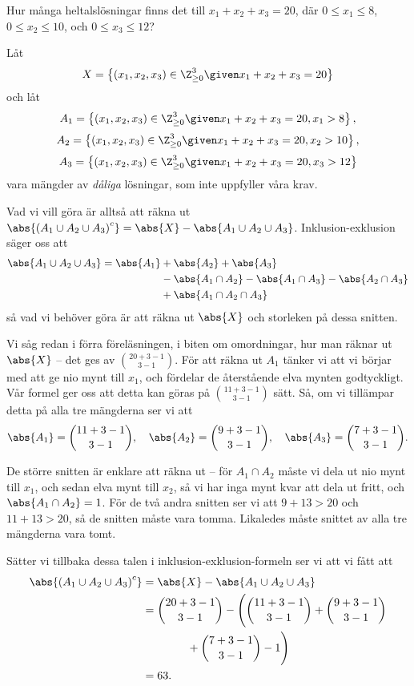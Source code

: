\documentclass[nobib]{tufte-handout}
\begin{document}
\begin{example}
  Hur många heltalslösningar finns det till $x_1 + x_2 + x_3 = 20$, där $0 \leq x_1 \leq 8$, $0 \leq x_2 \leq 10$, och $0 \leq x_3 \leq 12$?

  Låt
  $$X = \left\{(x_1, x_2, x_3) \in \Z_{\geq 0}^3 \given x_1 + x_2 + x_3 = 20\right\}$$
  och låt
  $$A_1 = \left\{(x_1, x_2, x_3) \in \Z_{\geq 0}^3 \given x_1 + x_2 + x_3 = 20, x_1 > 8\right\},$$
  $$A_2 = \left\{(x_1, x_2, x_3) \in \Z_{\geq 0}^3 \given x_1 + x_2 + x_3 = 20, x_2 > 10\right\},$$
  $$A_3 = \left\{(x_1, x_2, x_3) \in \Z_{\geq 0}^3 \given x_1 + x_2 + x_3 = 20, x_3 > 12\right\}$$
  vara mängder av \emph{dåliga} lösningar, som inte uppfyller våra krav.

  Vad vi vill göra är alltså att räkna ut $\abs{\left(A_1 \cup A_2 \cup A_3\right)^c} = \abs{X} - \abs{A_1 \cup A_2 \cup A_3}$. 
  Inklusion-exklusion säger oss att
  \begin{align*}
    \abs{A_1 \cup A_2 \cup A_3} = \abs{A_1}& + \abs{A_2} + \abs{A_3}\\
    &- \abs{A_1 \cap A_2} - \abs{A_1 \cap A_3} - \abs{A_2 \cap A_3}\\
    &+ \abs{A_1 \cap A_2 \cap A_3}
  \end{align*}
  så vad vi behöver göra är att räkna ut $\abs{X}$ och storleken på dessa snitten.

  Vi såg redan i förra föreläsningen, i biten om omordningar, hur man räknar ut $\abs{X}$ -- det ges av $\binom{20+3-1}{3-1}$. För att räkna ut $A_1$ tänker vi att vi börjar med att ge nio mynt till $x_1$, och fördelar de återstående elva mynten godtyckligt. Vår formel ger oss att detta kan göras på $\binom{11+3-1}{3-1}$ sätt. Så, om vi tillämpar detta på alla tre mängderna ser vi att
  $$\abs{A_1} = \binom{11+3-1}{3-1}, \quad\abs{A_2} = \binom{9+3-1}{3-1}, \quad\abs{A_3} = \binom{7+3-1}{3-1}.$$

  De större snitten är enklare att räkna ut -- för $A_1\cap A_2$ måste vi dela ut nio mynt till $x_1$, och sedan elva mynt till $x_2$, så vi har inga mynt kvar att dela ut fritt, och $\abs{A_1 \cap A_2} = 1$. För de två andra snitten ser vi att $9 + 13 > 20$ och $11 + 13 > 20$, så de snitten måste vara tomma. Likaledes måste snittet av alla tre mängderna vara tomt.

  Sätter vi tillbaka dessa talen i inklusion-exklusion-formeln ser vi att vi fått att
  \begin{align*}
    \abs{\left(A_1 \cup A_2 \cup A_3\right)^c} &= \abs{X} - \abs{A_1 \cup A_2 \cup A_3}\\
    &= \binom{20 + 3 - 1}{3 - 1} - \Bigg(\binom{11+3-1}{3-1}+ \binom{9+3-1}{3-1}\\
    &\qquad\qquad + \binom{7+3-1}{3-1}- 1\Bigg)\\
    &= 63.
  \end{align*}
\end{example}
\end{document}
